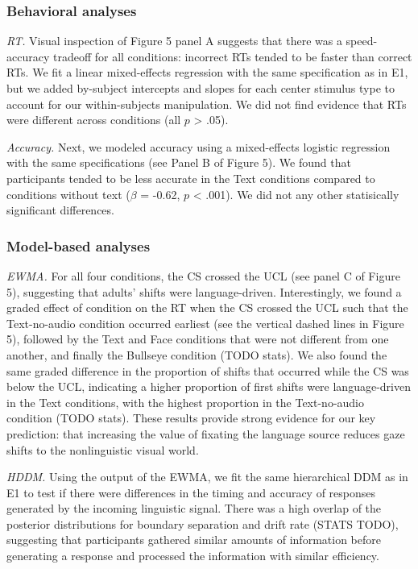 \documentclass[10pt, letterpaper]{article}
\begin{document}
\subsubsection{Behavioral analyses}\label{behavioral-analyses-1}

\emph{RT.} Visual inspection of Figure 5 panel A suggests that there was
a speed-accuracy tradeoff for all conditions: incorrect RTs tended to be
faster than correct RTs. We fit a linear mixed-effects regression with
the same specification as in E1, but we added by-subject intercepts and
slopes for each center stimulus type to account for our within-subjects
manipulation. We did not find evidence that RTs were different across
conditions (all \(p\) \textgreater{} .05).

\emph{Accuracy.} Next, we modeled accuracy using a mixed-effects
logistic regression with the same specifications (see Panel B of Figure
5). We found that participants tended to be less accurate in the Text
conditions compared to conditions without text (\(\beta\) = -0.62, \(p\)
\textless{} .001). We did not any other statisically significant
differences.

\subsubsection{Model-based analyses}\label{model-based-analyses-1}

\emph{EWMA.} For all four conditions, the CS crossed the UCL (see panel
C of Figure 5), suggesting that adults' shifts were language-driven.
Interestingly, we found a graded effect of condition on the RT when the
CS crossed the UCL such that the Text-no-audio condition occurred
earliest (see the vertical dashed lines in Figure 5), followed by the
Text and Face conditions that were not different from one another, and
finally the Bullseye condition (TODO stats). We also found the same
graded difference in the proportion of shifts that occurred while the CS
was below the UCL, indicating a higher proportion of first shifts were
language-driven in the Text conditions, with the highest proportion in
the Text-no-audio condition (TODO stats). These results provide strong
evidence for our key prediction: that increasing the value of fixating
the language source reduces gaze shifts to the nonlinguistic visual
world.

\emph{HDDM.} Using the output of the EWMA, we fit the same hierarchical
DDM as in E1 to test if there were differences in the timing and
accuracy of responses generated by the incoming linguistic signal. There
was a high overlap of the posterior distributions for boundary
separation and drift rate (STATS TODO), suggesting that participants
gathered similar amounts of information before generating a response and
processed the information with similar efficiency.
\end{document}
